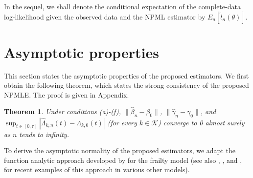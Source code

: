 \documentclass{statsoc}
\newtheorem{theorem}{Theorem}[section]
\begin{document}
In the sequel, we shall denote the conditional expectation of the complete-data log-likelihood given the observed data and the NPML estimator by $E_n[\widetilde l_n(\theta)]$.

\section{Asymptotic properties}\label{asymprp}

This section states the asymptotic properties of the proposed estimators. We first obtain the following theorem, which states the strong consistency of the proposed NPMLE. The proof is given in Appendix.

\begin{theorem}\label{csy}
Under conditions (a)-(f), $\|\widehat\beta_n-\beta_0\|$, $\|\widehat\gamma_n-\gamma_0\|$, and $\sup_{t\in[0,\tau]}|\widehat\Lambda_{k,n}(t)-\Lambda_{k,0}(t)|$ (for every $k\in\mathcal K$) converge to 0 almost surely as $n$ tends to infinity.
\end{theorem}

To derive the asymptotic normality of the proposed estimators, we adapt the function analytic approach developed by \cite{murphy95} for the frailty model (see also \cite{chang05}, \cite{korui07}, and \cite{lu08}, for recent examples of this approach in various other models).
\end{document}
